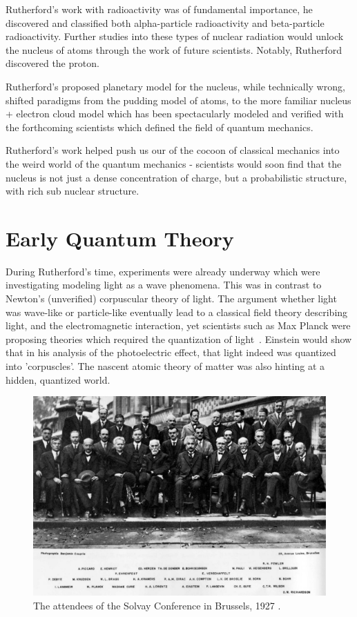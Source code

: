 Rutherford's work with radioactivity was of fundamental importance, he
discovered and classified both alpha-particle radioactivity and beta-particle
radioactivity. Further studies into these types of nuclear radiation would
unlock the nucleus of atoms through the work of future scientists. Notably,
Rutherford discovered the proton.

Rutherford's proposed planetary model for the nucleus, while technically wrong,
shifted paradigms from the pudding model of  atoms, to the more familiar nucleus
+ electron cloud model which has been spectacularly modeled and verified with
the forthcoming scientists which defined the field of quantum mechanics.

Rutherford's work helped push us our of the cocoon of classical mechanics into
the weird world of the quantum mechanics - scientists would soon find that the
nucleus is not just a dense concentration of charge, but a probabilistic
structure, with rich sub nuclear structure.

\clearpage
\section{Early Quantum Theory}

During Rutherford's time, experiments were already underway which were
investigating modeling light as a wave phenomena. This was in contrast to
Newton's (unverified) corpuscular theory of light. The argument whether light
was wave-like or particle-like eventually lead to a classical field theory
describing light, and the electromagnetic interaction, yet scientists such as
Max Planck were proposing theories which required the quantization of
light~\cite{Planck1901}. Einstein would show that in his analysis of the
photoelectric effect, that light indeed was quantized into 'corpuscles'. The
nascent atomic theory of matter was also hinting at a hidden, quantized world.

\begin{figure}
	\centering
	\includegraphics[width=\linewidth]{./figures/solvay.jpg}
	\caption{
		The attendees of the Solvay Conference in Brussels, 1927
		 \cite{BenjaminCroupie1927}.
	}
	\label{fig:solvay}
\end{figure}

